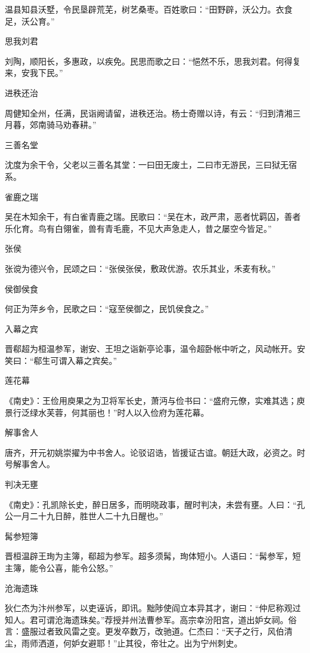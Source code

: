 \documentclass[a4paper,12pt,UTF8,twoside]{ctexbook}
\begin{document}
    温县知县沃墅，令民垦辟荒芜，树艺桑枣。百姓歌曰：“田野辟，沃公力。衣食足，沃公育。”
    
    思我刘君
    
    刘陶，顺阳长，多惠政，以疾免。民思而歌之曰：“悒然不乐，思我刘君。何得复来，安我下民。”
    
    进秩还治
    
    周健知全州，任满，民诣阙请留，进秩还治。杨士奇赠以诗，有云：“归到清湘三月暮，郊南骑马劝春耕。”
    
    三善名堂
    
    沈度为余干令，父老以三善名其堂：一曰田无废土，二曰市无游民，三曰狱无宿系。
    
    雀鹿之瑞
    
    吴在木知余干，有白雀青鹿之瑞。民歌曰：“吴在木，政严肃，恶者忧羁囚，善者乐化育。鸟有白翎雀，兽有青毛鹿，不见大声急走人，昔之屡空今皆足。”
    
    张侯
    
    张谠为德兴令，民颂之曰：“张侯张侯，敷政优游。农乐其业，禾麦有秋。”
    
    侯御侯食
    
    何正为萍乡令，民歌之曰：“寇至侯御之，民饥侯食之。”
    
    入幕之宾
    
    晋郗超为桓温参军，谢安、王坦之诣新亭论事，温令超卧帐中听之，风动帐开。安笑曰：“郗生可谓入幕之宾矣。”
    
    莲花幕
    
    《南史》：王俭用庾果之为卫将军长史，萧沔与俭书曰：“盛府元僚，实难其选；庾景行泛绿水芙蓉，何其丽也！”时人以入俭府为莲花幕。
    
    解事舍人
    
    唐齐，开元初姚崇擢为中书舍人。论驳诏诰，皆援证古谊。朝廷大政，必资之。时号解事舍人。
    
    判决无壅
    
    《南史》：孔凯除长史，醉日居多，而明晓政事，醒时判决，未尝有壅。人曰：“孔公一月二十九日醉，胜世人二十九日醒也。”
    
    髯参短簿
    
    晋桓温辟王珣为主簿，郗超为参军。超多须髯，珣体短小。人语曰：“髯参军，短主簿，能令公喜，能令公怒。”
    
    沧海遗珠
    
    狄仁杰为汴州参军，以吏诬诉，即讯。黜陟使阎立本异其才，谢曰：“仲尼称观过知人。君可谓沧海遗珠矣。”荐授并州法曹参军。高宗幸汾阳宫，道出妒女祠。俗言：盛服过者致风雷之变。更发卒数万，改驰道。仁杰曰：“天子之行，风伯清尘，雨师洒道，何妒女避耶！”止其役，帝壮之。出为宁州刺史。
    
\end{document}
